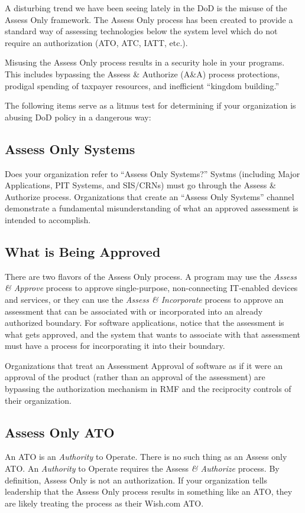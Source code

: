 A disturbing trend we have been seeing lately in the DoD is the misuse of the Assess Only framework. The Assess Only process has been created to provide a standard way of assessing technologies below the system level which do not require an authorization (ATO, ATC, IATT, etc.).\autocite[\pno~13]{20240212:dodi851001}

Misusing the Assess Only process results in a security hole in your programs. This includes bypassing the Assess \& Authorize (A\&A) process protections, prodigal spending of taxpayer resources, and inefficient ``kingdom building.''

The following items serve as a litmus test for determining if your organization is abusing DoD policy in a dangerous way:

\subsection{Assess Only Systems}
Does your organization refer to ``Assess Only Systems?'' Systms (including Major Applications, PIT Systems, and SIS/CRNs) must go through the Assess \& Authorize process. Organizations that create an ``Assess Only Systems'' channel demonstrate a fundamental misunderstanding of what an approved assessment is intended to accomplish.

\subsection{What is Being Approved}
There are two flavors of the Assess Only process. A program may use the \textit{Assess \& Approve} process to approve single-purpose, non-connecting IT-enabled devices and services, or they can use the \textit{Assess \& Incorporate} process to approve an assessment that can be associated with or incorporated into an already authorized boundary.\autocite[\pno~11]{20240212:vaglia2017} For software applications, notice that the assessment is what gets approved, and the system that wants to associate with that assessment must have a process for incorporating it into their boundary.

Organizations that treat an Assessment Approval of software as if it were an approval of the product (rather than an approval of the assessment) are bypassing the authorization mechanism in RMF and the reciprocity controls of their organization.

\subsection{Assess Only ATO}
An ATO is an \textit{Authority} to Operate. There is no such thing as an Assess only ATO. An \textit{Authority} to Operate requires the Assess \textit{\& Authorize} process. By definition, Assess Only is not an authorization. If your organization tells leadership that the Assess Only process results in something like an ATO, they are likely treating the process as their Wish.com ATO.

